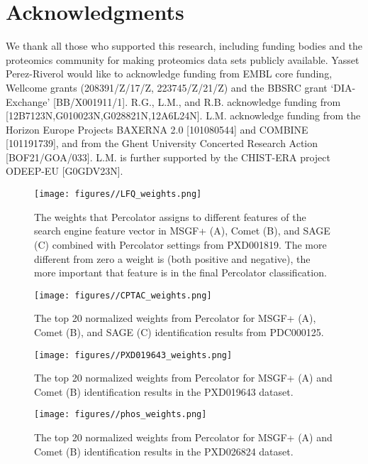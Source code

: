 \documentclass[12pt]{article}
\begin{document}
\section*{Acknowledgments}
We thank all those who supported this research, including funding bodies and the proteomics community for making proteomics data sets publicly available. 
Yasset Perez-Riverol would like to acknowledge funding from EMBL core funding, Wellcome grants (208391/Z/17/Z, 223745/Z/21/Z) and the BBSRC grant ‘DIA-Exchange’ [BB/X001911/1].
R.G., L.M., and R.B. acknowledge funding from [12B7123N,G010023N,G028821N,12A6L24N]. L.M. acknowledge funding from the Horizon Europe Projects BAXERNA 2.0 [101080544] and COMBINE [101191739], and from the Ghent University Concerted Research Action [BOF21/GOA/033]. L.M. is further supported by the CHIST-ERA project ODEEP-EU [G0GDV23N].



\renewcommand\thefigure{S\arabic{figure}}
\setcounter{figure}{0}

\begin{figure}[ht!]
	\centering
	\texttt{[image: figures//LFQ\_weights.png]}
	\caption{The weights that Percolator assigns to different features of the search engine feature vector in MSGF+ (A), Comet (B), and SAGE (C) combined with Percolator settings from PXD001819. The more different from zero a weight is (both positive and negative), the more important that feature is in the final Percolator classification.}
	\label{fig:PXD001819_svm_weights}
\end{figure}

\begin{figure}[ht!]
	\centering
	\texttt{[image: figures//CPTAC\_weights.png]}
	\caption{The top 20 normalized weights from Percolator for MSGF+ (A), Comet (B), and SAGE (C) identification results from PDC000125.}
	\label{fig:PDC_ms2rescore_weights}
\end{figure}

\begin{figure}[ht!]
	\centering
	\texttt{[image: figures//PXD019643\_weights.png]}
	\caption{The top 20 normalized weights from Percolator for MSGF+ (A) and Comet (B) identification results in the PXD019643 dataset.}
	\label{fig:PXD019643_features}
\end{figure}
\begin{figure}[ht!]
	\centering
	\texttt{[image: figures//phos\_weights.png]}
	\caption{The top 20 normalized weights from Percolator for MSGF+ (A) and Comet (B) identification results in the PXD026824 dataset.}
	\label{fig:phospho_features}
\end{figure}
\end{document}
